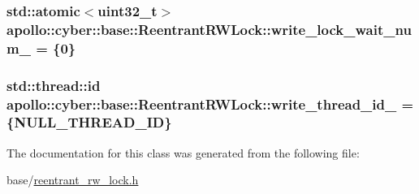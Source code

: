 \hypertarget{classapollo_1_1cyber_1_1base_1_1ReentrantRWLock_a374944a50ed1bb9997bfd1665ae7c3fc}{
\subsubsection[{write\-\_\-lock\-\_\-wait\-\_\-num\-\_\-}]{\setlength{\rightskip}{0pt plus 5cm}std\-::atomic$<$uint32\-\_\-t$>$ apollo\-::cyber\-::base\-::\-Reentrant\-R\-W\-Lock\-::write\-\_\-lock\-\_\-wait\-\_\-num\-\_\- = \{0\}\hspace{0.3cm}{\ttfamily [private]}}}\label{classapollo_1_1cyber_1_1base_1_1ReentrantRWLock_a374944a50ed1bb9997bfd1665ae7c3fc}
\hypertarget{classapollo_1_1cyber_1_1base_1_1ReentrantRWLock_ad9ffc19935a572a671f094c612581473}{
\subsubsection[{write\-\_\-thread\-\_\-id\-\_\-}]{\setlength{\rightskip}{0pt plus 5cm}std\-::thread\-::id apollo\-::cyber\-::base\-::\-Reentrant\-R\-W\-Lock\-::write\-\_\-thread\-\_\-id\-\_\- = \{{\bf N\-U\-L\-L\-\_\-\-T\-H\-R\-E\-A\-D\-\_\-\-I\-D}\}\hspace{0.3cm}{\ttfamily [private]}}}\label{classapollo_1_1cyber_1_1base_1_1ReentrantRWLock_ad9ffc19935a572a671f094c612581473}


The documentation for this class was generated from the following file\-:\begin{DoxyCompactItemize}
\item 
base/\hyperlink{reentrant__rw__lock_8h}{reentrant\-\_\-rw\-\_\-lock.\-h}\end{DoxyCompactItemize}
